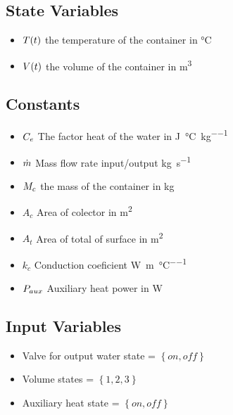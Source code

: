 \documentclass[a4paper,12pt]{book}
\begin{document}
    

    \subsection{State Variables}

    \begin{itemize}
    \item
    $T(t)$ the temperature of the container in \si{\degreeCelsius}
    \item
    $V(t)$ the volume of the container in \si{\metre^3}

    \end{itemize}

    \subsection{Constants}
    \begin{itemize}
    \item 
    $C_e$ The factor heat of the water in \si{\joule\per\degreeCelsius\per\kilogram}
    \item
    $\dot{m}$ Mass flow rate input/output  \si{\kilogram\per\second}
    \item
    $M_{c}$ the mass of the container in \si{\kilogram}
    \item
    $A_c$ Area of colector in \si{\metre^2}
    \item
    $A_t$ Area of total of surface in \si{\metre^2}
    \item
    $k_c$ Conduction coeficient \si{\watt\per\metre\per\degreeCelsius}
    \item
    $P_{aux}$ Auxiliary heat power in \si{\watt}

    \end{itemize}

    \subsection{Input Variables}
    \begin{itemize}
    \item
    Valve for output water state = $\left\lbrace on,off \right\rbrace $
    \item
    Volume states = $\left\lbrace1,2,3\right\rbrace $
    \item
    Auxiliary heat state = $\left\lbrace on,off \right\rbrace $


    \end{itemize}
\end{document}
